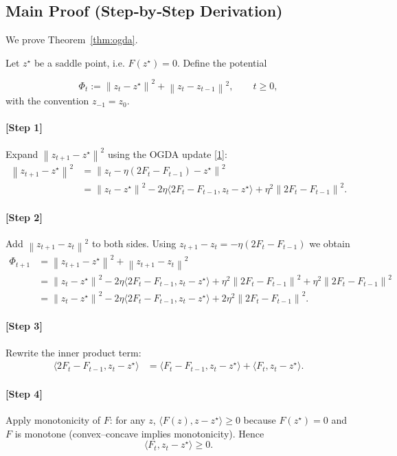 \documentclass[11pt]{article}
\newcommand{\norm}[1]{\left\lVert #1\right\rVert}
\newcommand{\ip}[2]{\langle #1,#2\rangle}
\begin{document}
\subsection*{Main Proof (Step‑by‑Step Derivation)}
We prove Theorem~\ref{thm:ogda}.  

Let $z^\star$ be a saddle point, i.e. $F(z^\star)=0$. Define the potential  

\[
\Phi_t:=\norm{z_t-z^\star}^2+\norm{z_t-z_{t-1}}^2,\qquad t\ge0,
\tag{P1}
\]
with the convention $z_{-1}=z_0$.

\paragraph{[Step 1]} Expand $\norm{z_{t+1}-z^\star}^2$ using the OGDA update \eqref{1}:
\[
\begin{aligned}
\norm{z_{t+1}-z^\star}^2
&=\norm{z_t-\eta(2F_t-F_{t-1})-z^\star}^2  \\
&=\norm{z_t-z^\star}^2-2\eta\ip{2F_t-F_{t-1}}{z_t-z^\star}
   +\eta^2\norm{2F_t-F_{t-1}}^2.
\end{aligned}
\tag{S1}
\]

\paragraph{[Step 2]} Add $\norm{z_{t+1}-z_t}^2$ to both sides. Using $z_{t+1}-z_t=-\eta(2F_t-F_{t-1})$ we obtain
\[
\begin{aligned}
\Phi_{t+1}
&=\norm{z_{t+1}-z^\star}^2+\norm{z_{t+1}-z_t}^2\\
&=\norm{z_t-z^\star}^2-2\eta\ip{2F_t-F_{t-1}}{z_t-z^\star}
   +\eta^2\norm{2F_t-F_{t-1}}^2
   +\eta^2\norm{2F_t-F_{t-1}}^2\\
&=\norm{z_t-z^\star}^2-2\eta\ip{2F_t-F_{t-1}}{z_t-z^\star}
   +2\eta^2\norm{2F_t-F_{t-1}}^2 .
\end{aligned}
\tag{S2}
\]

\paragraph{[Step 3]} Rewrite the inner product term:
\[
\begin{aligned}
\ip{2F_t-F_{t-1}}{z_t-z^\star}
&=\ip{F_t-F_{t-1}}{z_t-z^\star}+ \ip{F_t}{z_t-z^\star}.
\end{aligned}
\tag{S3}
\]

\paragraph{[Step 4]} Apply monotonicity of $F$: for any $z$, $\ip{F(z)}{z-z^\star}\ge 0$ because $F(z^\star)=0$ and $F$ is monotone (convex–concave implies monotonicity). Hence
\[
\ip{F_t}{z_t-z^\star}\ge 0.
\tag{S4}
\]
\end{document}
